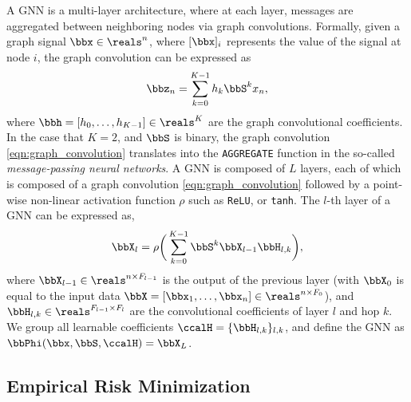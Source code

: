 \documentclass[lettersize,journal]{IEEEtran}
\newcommand{\non}{\rho}
\begin{document}
A GNN is a multi-layer architecture, where at each layer, messages are aggregated between neighboring nodes via graph convolutions. Formally, given a graph signal $\bbx \in \reals^n$, where $[\bbx]_i$ represents the value of the signal at node $i$, the graph convolution can be expressed as
\begin{align}\label{eqn:graph_convolution}
	\bbz_n = \sum_{k=0}^{K-1}h_k \bbS^k x_n, 
\end{align}
where $\bbh=[h_0,\dots,h_{K-1}]\in\reals^K$ are the graph convolutional coefficients. In the case that $K=2$, and $\bbS$ is binary, the graph convolution \eqref{eqn:graph_convolution} translates into the \texttt{AGGREGATE} function in the so-called \textit{message-passing neural networks}. 
A GNN is composed of $L$ layers, each of which is composed of a graph convolution \eqref{eqn:graph_convolution} followed by a point-wise non-linear activation function $\non$ such as \texttt{ReLU}, or \texttt{tanh}. The $l$-th layer of a GNN can be expressed as, 
\begin{align}\label{eqn:gnn_layer_l}
	\bbX_l = \non\bigg(\sum_{k=0}^{K-1} \bbS^k\bbX_{l-1}\bbH_{l,k}\bigg),
\end{align}
where $\bbX_{l-1}\in \reals^{n\times F_{l-1}}$ is the output of the previous layer (with $\bbX_{0}$ is equal to the input data $\bbX=[\bbx_1,\dots,\bbx_n]\in\reals^{n\times F_0}$), and $\bbH_{l,k}\in \reals ^{F_{l-1}\times F_{l}}$ are the convolutional coefficients of layer $l$ and hop $k$. We group all learnable coefficients $\ccalH=\{\bbH_{l,k}\}_{l,k}$, and define the GNN as $\bbPhi(\bbx,\bbS,\ccalH)=\bbX_L$. 

\subsection{Empirical Risk Minimization}
\end{document}
